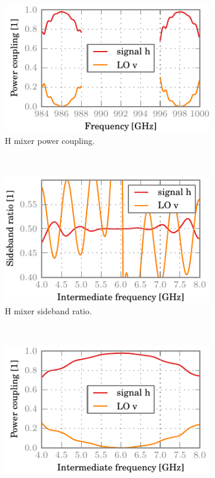 \begin{figure}[hbtp]
    \centering
    \begin{subfigure}[b]{.5\textwidth}
        \includegraphics{chapter_3/08_badrt_mhcr_h_dsb}%
        \caption{H mixer power coupling.}
    \end{subfigure}%
    \\
    \begin{subfigure}[b]{.5\textwidth}
        \includegraphics{chapter_3/08_badrt_mhcr_h_sbr}%
        \caption{H mixer sideband ratio.}
    \end{subfigure}%
    \\
    \begin{subfigure}[b]{.5\textwidth}
        \includegraphics{chapter_3/08_badrt_mhcr_h_ssb}%

\end{subfigure}
\end{figure}
